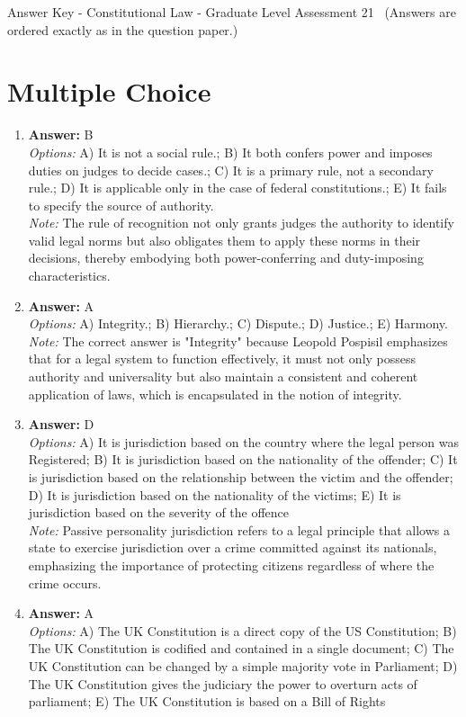 \documentclass[12pt]{article}
\begin{document}
\begin{center}
Answer Key - Constitutional Law - Graduate Level Assessment 21 \
\small (Answers are ordered exactly as in the question paper.)
\end{center}

\section*{Multiple Choice}
\begin{enumerate}[label=\arabic*.]
\item \textbf{Answer:} B
\\ \textit{Options:} A) It is not a social rule.; B) It both confers power and imposes duties on judges to decide cases.; C) It is a primary rule, not a secondary rule.; D) It is applicable only in the case of federal constitutions.; E) It fails to specify the source of authority.
\\ \textit{Note:} The rule of recognition not only grants judges the authority to identify valid legal norms but also obligates them to apply these norms in their decisions, thereby embodying both power-conferring and duty-imposing characteristics.
\item \textbf{Answer:} A
\\ \textit{Options:} A) Integrity.; B) Hierarchy.; C) Dispute.; D) Justice.; E) Harmony.
\\ \textit{Note:} The correct answer is "Integrity" because Leopold Pospisil emphasizes that for a legal system to function effectively, it must not only possess authority and universality but also maintain a consistent and coherent application of laws, which is encapsulated in the notion of integrity.
\item \textbf{Answer:} D
\\ \textit{Options:} A) It is jurisdiction based on the country where the legal person was Registered; B) It is jurisdiction based on the nationality of the offender; C) It is jurisdiction based on the relationship between the victim and the offender; D) It is jurisdiction based on the nationality of the victims; E) It is jurisdiction based on the severity of the offence
\\ \textit{Note:} Passive personality jurisdiction refers to a legal principle that allows a state to exercise jurisdiction over a crime committed against its nationals, emphasizing the importance of protecting citizens regardless of where the crime occurs.
\item \textbf{Answer:} A
\\ \textit{Options:} A) The UK Constitution is a direct copy of the US Constitution; B) The UK Constitution is codified and contained in a single document; C) The UK Constitution can be changed by a simple majority vote in Parliament; D) The UK Constitution gives the judiciary the power to overturn acts of parliament; E) The UK Constitution is based on a Bill of Rights

\end{enumerate}
\end{document}
